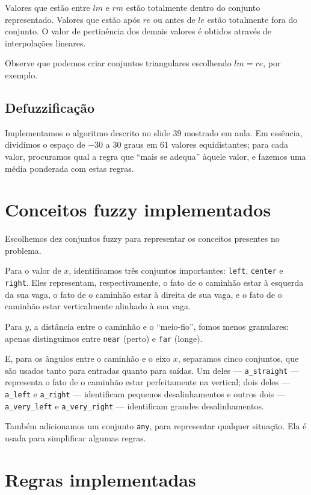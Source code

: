 \documentclass{article}
\begin{document}
Valores que estão entre $lm$ e $rm$ estão totalmente dentro do conjunto representado.
Valores que estão após $re$ ou antes de $le$ estão totalmente fora do conjunto.
O valor de pertinência dos demais valores é obtidos através de interpolações lineares.

Observe que podemos criar conjuntos triangulares escolhendo $lm = re$,
por exemplo.

\subsection{Defuzzificação}

Implementamos o algoritmo descrito no slide $39$ mostrado em aula.
Em essência, dividimos o espaço de $-30$ a $30$ graus em $61$ valores equidistantes;
para cada valor, procuramos qual a regra que ``mais se adequa'' àquele valor,
e fazemos uma média ponderada com estas regras.

\section{Conceitos fuzzy implementados}

Escolhemos dez conjuntos fuzzy para representar os conceitos presentes no problema.

Para o valor de $x$, identificamos três conjuntos importantes:
\lstinline"left", \lstinline"center" e \lstinline"right".
Eles representam, respectivamente,
o fato de o caminhão estar à esquerda da sua vaga,
o fato de o caminhão estar à direita de sua vaga,
e o fato de o caminhão estar verticalmente alinhado à sua vaga.

Para $y$, a distância entre o caminhão e o ``meio-fio'',
fomos menos granulares:
apenas distinguimos entre \lstinline"near" (perto)
e \lstinline"far" (longe).

E, para os ângulos entre o caminhão e o eixo $x$,
separamos cinco conjuntos,
que são usados tanto para entradas quanto para saídas.
Um deles --- \lstinline"a_straight" ---
representa o fato de o caminhão estar perfeitamente na vertical;
dois deles --- \lstinline"a_left" e \lstinline"a_right" ---
identificam pequenos desalinhamentos
e outros dois --- \lstinline"a_very_left" e \lstinline"a_very_right" ---
identificam grandes desalinhamentos.

Também adicionamos um conjunto \lstinline"any",
para representar qualquer situação.
Ela é usada para simplificar algumas regras.

\section{Regras implementadas}
\end{document}
